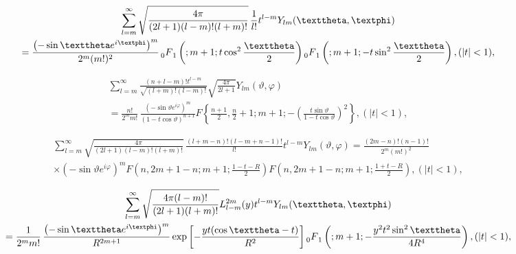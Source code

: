 \begin{multline}
\sum_{l=m}^{\infty} \sqrt{\frac{4 \pi}{(2 l+1)(l-m)!(l+m)!}} \, \frac{1}{l!} t^{l-m} Y_{l m}(\vartheta, \varphi)  \\
=\frac{\left(-\sin \vartheta e^{i \varphi}\right)^{m}}{2^{m}(m!)^{2}} \Fnm[l]{0}{1}{}{m+1}{t \cos ^{2} \frac{\vartheta}{2}}
\Fnm[l]{0}{1}{}{m+1}{-t \sin ^{2} \frac{\vartheta}{2}},(|t|<1),  \label{eq:5:10:7}
\end{multline}

\begin{multline}
\sum_{l=m}^{\infty} \frac{(n+l-m)!t^{l-m}}{\sqrt{(l+m)!(l-m)!}} \sqrt{\frac{4 \pi}{2 l+1}} Y_{l m}(\vartheta, \varphi)  \\
=\frac{n!}{2^{m} m!} \, \frac{\left(-\sin \vartheta e^{i \varphi}\right)^{m}}{(1-t \cos \vartheta)^{n+1}} F\left\{\frac{n+1}{2}, \frac{n}{2}+1 ; m+1 ;-\left(\frac{t \sin \vartheta}{1-t \cos \vartheta}\right)^{2}\right\},(|t|<1), \label{eq:5:10:8}
\end{multline}

\begin{multline}
\sum_{l=m}^{\infty} \sqrt{\frac{4 \pi}{(2 l+1)(l-m)!(l+m)!}} \, \frac{(l+m-n)!(l-m+n-1)!}{l!} t^{l-m} Y_{l m}(\vartheta, \varphi)=\frac{(2 m-n)!(n-1)!}{2^{m}(m!)^{2}}  \\
\times\left(-\sin \vartheta e^{i \varphi}\right)^{m} F\left(n, 2 m+1-n ; m+1 ; \frac{1-t-R}{2}\right) F\left(n, 2 m+1-n ; m+1 ; \frac{1+t-R}{2}\right),(|t|<1),  \label{eq:5:10:9}
\end{multline}

\begin{multline}
\sum_{l=m}^{\infty} \sqrt{\frac{4 \pi(l-m)!}{(2 l+1)(l+m)!}} L_{l-m}^{2 m}(y) t^{l-m} Y_{l m}(\vartheta, \varphi)  \\
=\frac{1}{2^{m} m!} \, \frac{\left(-\sin \vartheta e^{i \varphi}\right)^{m}}{R^{2 m+1}} \exp \left[-\frac{y t(\cos \vartheta-t)}{R^{2}}\right] \Fnm[l]{0}{1}{}{m+1}{-\frac{y^{2} t^{2} \sin ^{2} \vartheta}{4 R^{4}}},(|t|<1),  \label{eq:5:10:10}
\end{multline}


